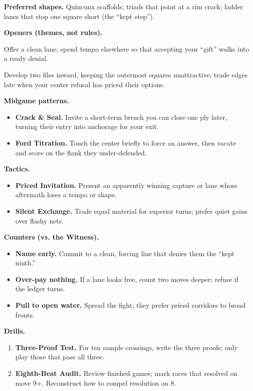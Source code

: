 \documentclass[11pt]{article}
\begin{document}
\begin{itemize}
\medskip
\noindent\textbf{Preferred shapes.} Quincunx scaffolds; triads that point at a rim crack; ladder lanes that stop one square short (the “kept step”).

\medskip
\noindent\textbf{Openers (themes, not rules).}
\begin{description}\setlength\itemsep{0.35em}
  \item[\textit{Copper Ledger.}] Offer a clean lane; spend tempo elsewhere so that accepting your “gift” walks into a ready denial.
  \item[\textit{Salt Ring.}] Develop two files inward, keeping the outermost squares unattractive; trade edges late when your center refusal has priced their options.
\end{description}

\medskip
\noindent\textbf{Midgame patterns.}
\begin{itemize}\setlength\itemsep{0.25em}
  \item \textbf{Crack \& Seal.} Invite a short-term breach you can close one ply later, turning their entry into anchorage for your exit.
  \item \textbf{Ford Titration.} Touch the center briefly to force an answer, then vacate and score on the flank they under-defended.
\end{itemize}

\medskip
\noindent\textbf{Tactics.}
\begin{itemize}\setlength\itemsep{0.25em}
  \item \textbf{Priced Invitation.} Present an apparently winning capture or lane whose aftermath loses a tempo or shape.
  \item \textbf{Silent Exchange.} Trade equal material for superior turns; prefer quiet gains over flashy nets.
\end{itemize}

\medskip
\noindent\textbf{Counters (vs. the Witness).}
\begin{itemize}\setlength\itemsep{0.25em}
  \item \textbf{Name early.} Commit to a clean, forcing line that denies them the “kept ninth.”
  \item \textbf{Over-pay nothing.} If a lane looks free, count two moves deeper; refuse if the ledger turns.
  \item \textbf{Pull to open water.} Spread the fight; they prefer priced corridors to broad fronts.
\end{itemize}

\medskip
\noindent\textbf{Drills.}
\begin{enumerate}\setlength\itemsep{0.25em}
  \item \textbf{Three-Proof Test.} For ten sample crossings, write the three proofs; only play those that pass all three.
  \item \textbf{Eighth-Beat Audit.} Review finished games; mark races that resolved on move 9+. Reconstruct how to compel resolution on 8.
\end{enumerate}


\end{itemize}
\end{document}
